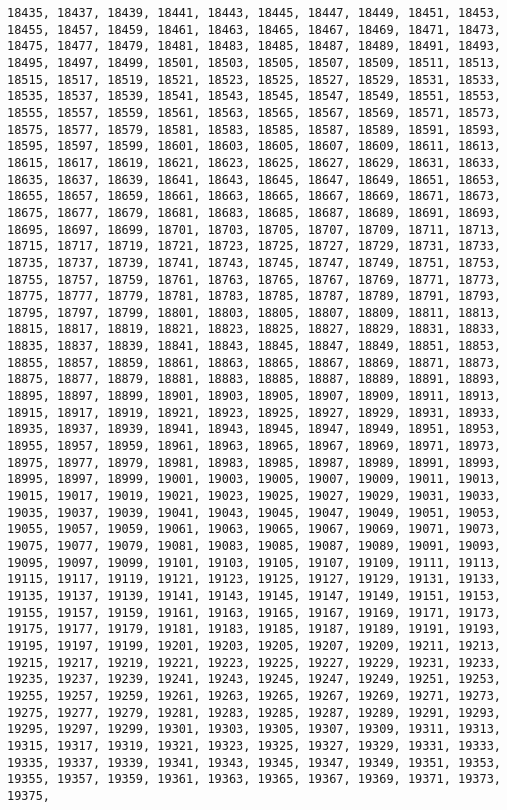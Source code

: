 \documentclass[11pt]{article}
\begin{document}
\begin{Verbatim}[commandchars=\\\{\}]
18435, 18437, 18439, 18441, 18443, 18445, 18447, 18449, 18451, 18453, 18455, 18457, 18459, 18461, 18463, 18465, 18467, 18469, 18471, 18473, 18475, 18477, 18479, 18481, 18483, 18485, 18487, 18489, 18491, 18493, 18495, 18497, 18499, 18501, 18503, 18505, 18507, 18509, 18511, 18513, 18515, 18517, 18519, 18521, 18523, 18525, 18527, 18529, 18531, 18533, 18535, 18537, 18539, 18541, 18543, 18545, 18547, 18549, 18551, 18553, 18555, 18557, 18559, 18561, 18563, 18565, 18567, 18569, 18571, 18573, 18575, 18577, 18579, 18581, 18583, 18585, 18587, 18589, 18591, 18593, 18595, 18597, 18599, 18601, 18603, 18605, 18607, 18609, 18611, 18613, 18615, 18617, 18619, 18621, 18623, 18625, 18627, 18629, 18631, 18633, 18635, 18637, 18639, 18641, 18643, 18645, 18647, 18649, 18651, 18653, 18655, 18657, 18659, 18661, 18663, 18665, 18667, 18669, 18671, 18673, 18675, 18677, 18679, 18681, 18683, 18685, 18687, 18689, 18691, 18693, 18695, 18697, 18699, 18701, 18703, 18705, 18707, 18709, 18711, 18713, 18715, 18717, 18719, 18721, 18723, 18725, 18727, 18729, 18731, 18733, 18735, 18737, 18739, 18741, 18743, 18745, 18747, 18749, 18751, 18753, 18755, 18757, 18759, 18761, 18763, 18765, 18767, 18769, 18771, 18773, 18775, 18777, 18779, 18781, 18783, 18785, 18787, 18789, 18791, 18793, 18795, 18797, 18799, 18801, 18803, 18805, 18807, 18809, 18811, 18813, 18815, 18817, 18819, 18821, 18823, 18825, 18827, 18829, 18831, 18833, 18835, 18837, 18839, 18841, 18843, 18845, 18847, 18849, 18851, 18853, 18855, 18857, 18859, 18861, 18863, 18865, 18867, 18869, 18871, 18873, 18875, 18877, 18879, 18881, 18883, 18885, 18887, 18889, 18891, 18893, 18895, 18897, 18899, 18901, 18903, 18905, 18907, 18909, 18911, 18913, 18915, 18917, 18919, 18921, 18923, 18925, 18927, 18929, 18931, 18933, 18935, 18937, 18939, 18941, 18943, 18945, 18947, 18949, 18951, 18953, 18955, 18957, 18959, 18961, 18963, 18965, 18967, 18969, 18971, 18973, 18975, 18977, 18979, 18981, 18983, 18985, 18987, 18989, 18991, 18993, 18995, 18997, 18999, 19001, 19003, 19005, 19007, 19009, 19011, 19013, 19015, 19017, 19019, 19021, 19023, 19025, 19027, 19029, 19031, 19033, 19035, 19037, 19039, 19041, 19043, 19045, 19047, 19049, 19051, 19053, 19055, 19057, 19059, 19061, 19063, 19065, 19067, 19069, 19071, 19073, 19075, 19077, 19079, 19081, 19083, 19085, 19087, 19089, 19091, 19093, 19095, 19097, 19099, 19101, 19103, 19105, 19107, 19109, 19111, 19113, 19115, 19117, 19119, 19121, 19123, 19125, 19127, 19129, 19131, 19133, 19135, 19137, 19139, 19141, 19143, 19145, 19147, 19149, 19151, 19153, 19155, 19157, 19159, 19161, 19163, 19165, 19167, 19169, 19171, 19173, 19175, 19177, 19179, 19181, 19183, 19185, 19187, 19189, 19191, 19193, 19195, 19197, 19199, 19201, 19203, 19205, 19207, 19209, 19211, 19213, 19215, 19217, 19219, 19221, 19223, 19225, 19227, 19229, 19231, 19233, 19235, 19237, 19239, 19241, 19243, 19245, 19247, 19249, 19251, 19253, 19255, 19257, 19259, 19261, 19263, 19265, 19267, 19269, 19271, 19273, 19275, 19277, 19279, 19281, 19283, 19285, 19287, 19289, 19291, 19293, 19295, 19297, 19299, 19301, 19303, 19305, 19307, 19309, 19311, 19313, 19315, 19317, 19319, 19321, 19323, 19325, 19327, 19329, 19331, 19333, 19335, 19337, 19339, 19341, 19343, 19345, 19347, 19349, 19351, 19353, 19355, 19357, 19359, 19361, 19363, 19365, 19367, 19369, 19371, 19373, 19375, 
\end{Verbatim}
\end{document}
